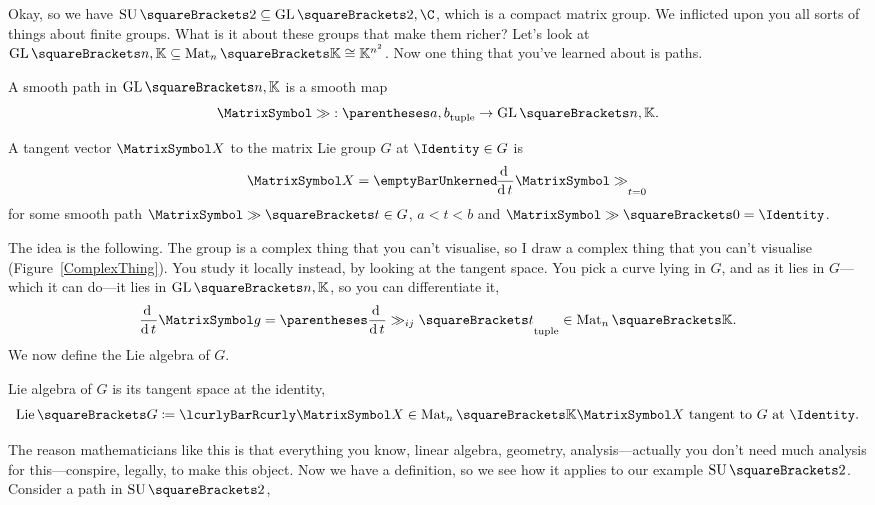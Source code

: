 \documentclass[10pt, a4paper, twoside]{lecturenotes}
\begin{document}
\NewLecture[date=2013-04-25]
Okay, so we have $\SpecialUnitaryGroup\of 2 \Subset \GeneralLinearGroup\of{2,\C}$, which is a compact matrix group. We inflicted upon you all sorts of things about %
finite groups. What is it about these groups that make them richer? Let's look at $\GeneralLinearGroup\of{n,\Field}\Subset\Matrices n \Field \Isomorphic \Field^{n^2}$. Now one thing that you've learned about is paths.
\begin{definition}
A smooth path in $\GeneralLinearGroup\of{n,\Field}$ is a smooth map\[\FunctionSpec\matgg{\tuple{a,b}}{\GeneralLinearGroup\of{n,\Field}}\text.\]
\end{definition}
\begin{definition}
A tangent vector $\matX$ to the matrix Lie group $G$  at $\Identity\in G$ is \[\matX=\Evaluate{\derivop t \matgg}{t=0}\] for some smooth path $\matgg\of t\in G$, $a<t<b$ and $\matgg\of 0 = \Identity$. %
\end{definition}
The idea is the following. The group is a complex thing that you can't visualise, so I draw a complex thing that you can't visualise (Figure~\ref{ComplexThing}). You study it locally instead, by looking at the tangent space. You pick a curve lying in $G$, and as it lies in $G$---which it can do---it lies in $\GeneralLinearGroup\of{n,\Field}$, so you can differentiate it,\[
\derivop t \matg = \tuple{\derivop t \gg_{ij}\of t}\in\Matrices n \Field \text.
\]
We now define the Lie algebra of $G$.
\begin{definition} Lie algebra of $G$ is its tangent space at the identity,
\[
\LieAlgebra\of G \DefineAs \setst{\matX\in\Matrices n \Field}{\text{$\matX$ tangent to $G$ at $\Identity$}}\text.
\]
\end{definition}
The reason mathematicians like this is that everything you know, linear algebra, geometry, analysis---actually you don't need much analysis for this---conspire, legally, to make this object.
Now we have a definition, so we see how it applies to our example $\SpecialUnitaryGroup \of 2$.
Consider a path in $\SpecialUnitaryGroup \of 2$,
\end{document}
